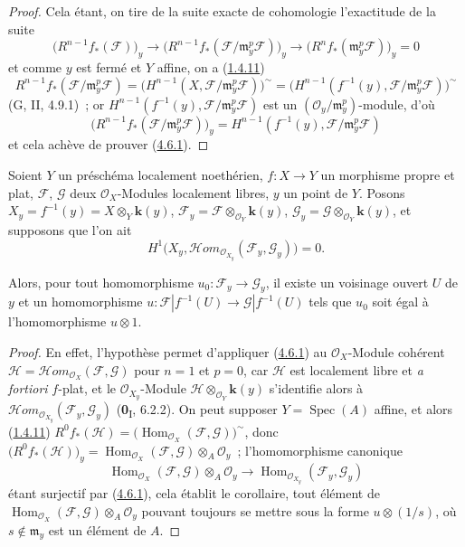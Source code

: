 \begin{proof}
Cela étant, on tire de la suite exacte de cohomologie l'exactitude de la
suite
\[
\bigl(R^{n-1}f_*(\mathcal F)\bigr)_y
\longrightarrow
\bigl(R^{n-1}f_*(\mathcal F/\mathfrak m_y^p\mathcal F)\bigr)_y
\longrightarrow
\bigl(R^nf_*(\mathfrak m_y^p\mathcal F)\bigr)_y=0
\]
et comme $y$ est fermé et $Y$ affine, on a (\hyperref[III.1.4.11-fr]{1.4.11})
\[
R^{n-1}f_*(\mathcal F/\mathfrak m_y^p\mathcal F)
=\bigl(H^{n-1}(X,\mathcal F/\mathfrak m_y^p\mathcal F)\bigr)^\sim
=\bigl(H^{n-1}(f^{-1}(y),
\mathcal F/\mathfrak m_y^p\mathcal F)\bigr)^\sim
\]
(G, II, 4.9.1)~; or
$H^{n-1}(f^{-1}(y),\mathcal F/\mathfrak m_y^p\mathcal F)$ est un
$(\mathcal O_y/\mathfrak m_y^p)$-module, d'où
\[
\bigl(R^{n-1}f_*(\mathcal F/\mathfrak m_y^p\mathcal F)\bigr)_y
=H^{n-1}(f^{-1}(y),\mathcal F/\mathfrak m_y^p\mathcal F)
\]
et cela achève de prouver (\hyperref[III.4.6.1-fr]{4.6.1}).
\end{proof}

\begin{corollary}[4.6.2]
\label{III.4.6.2-fr}
Soient $Y$ un préschéma localement noethérien, $f:X\to Y$ un morphisme propre
et plat, $\mathcal F$, $\mathcal G$ deux $\mathcal O_X$-Modules localement
libres, $y$ un point de $Y$. Posons
$X_y=f^{-1}(y)=X\otimes_Y\boldsymbol{k}(y)$,
$\mathcal F_y=\mathcal F\otimes_{\mathcal O_Y}\boldsymbol{k}(y)$,
$\mathcal G_y=\mathcal G\otimes_{\mathcal O_Y}\boldsymbol{k}(y)$,
et supposons que l'on ait
\[
\label{III.4.6.2.1-fr}
H^1\bigl(X_y,
\mathcal{H}\!om_{\mathcal O_{X_y}}(\mathcal F_y,\mathcal G_y)\bigr)=0.
\tag{4.6.2.1}
\]

Alors, pour tout homomorphisme $u_0:\mathcal F_y\to\mathcal G_y$, il existe
un voisinage ouvert $U$ de $y$ et un homomorphisme
$u:\mathcal F|f^{-1}(U)\longrightarrow\mathcal G|f^{-1}(U)$
tels que $u_0$ soit égal à l'homomorphisme $u\otimes1$.
\end{corollary}

\begin{proof}
En effet, l'hypothèse permet d'appliquer (\hyperref[III.4.6.1-fr]{4.6.1}) au
$\mathcal O_X$-Module cohérent
$\mathcal H=\mathcal{H}\!om_{\mathcal O_X}(\mathcal F,\mathcal G)$ pour
$n=1$ et $p=0$, car $\mathcal H$ est localement libre et \emph{a fortiori}
$f$-plat, et le $\mathcal O_{X_y}$-Module
$\mathcal H\otimes_{\mathcal O_Y}\boldsymbol{k}(y)$ s'identifie alors à
$\mathcal{H}\!om_{\mathcal O_{X_y}}(\mathcal F_y,\mathcal G_y)$
(\textbf{0}\textsubscript{I}, 6.2.2). On peut supposer $Y=\operatorname{Spec}(A)$
affine, et alors (\hyperref[III.1.4.11-fr]{1.4.11})
$R^0f_*(\mathcal H)=
\bigl(\operatorname{Hom}_{\mathcal O_X}(\mathcal F,\mathcal G)\bigr)^\sim$,
donc
$\bigl(R^0f_*(\mathcal H)\bigr)_y
=\operatorname{Hom}_{\mathcal O_X}(\mathcal F,\mathcal G)
\otimes_A\mathcal O_y$~;
l'homomorphisme canonique
\[
\operatorname{Hom}_{\mathcal O_X}(\mathcal F,\mathcal G)
\otimes_A\mathcal O_y
\longrightarrow
\operatorname{Hom}_{\mathcal O_{X_y}}(\mathcal F_y,\mathcal G_y)
\]
étant surjectif par (\hyperref[III.4.6.1-fr]{4.6.1}), cela établit le
corollaire, tout élément de
$\operatorname{Hom}_{\mathcal O_X}(\mathcal F,\mathcal G)
\otimes_A\mathcal O_y$ pouvant toujours se mettre sous la forme
$u\otimes(1/s)$, où $s\notin\mathfrak m_y$ est un élément de $A$.
\end{proof}

